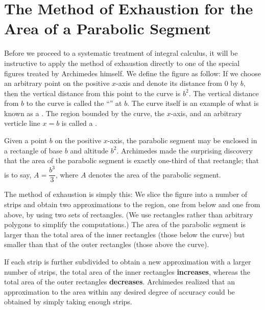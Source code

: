 \section{The Method of Exhaustion for the Area of a Parabolic Segment}\label{sec:1.1.3}

\begin{note}
  Before we proceed to a systematic treatment of integral calculus, it will be instructive to apply the method of exhaustion directly to one of the special figures treated by Archimedes himself.
  We define the figure as follow:
  If we choose an arbitrary point on the positive \(x\)-axis and denote its distance from \(0\) by \(b\), then the vertical distance from this point to the curve is \(b^2\).
  The vertical distance from \(b\) to the curve is called the ``'' at \(b\).
  The curve itself is an example of what is known as a \textbf{}.
  The region bounded by the curve, the \(x\)-axis, and an arbitrary verticle line \(x = b\) is called a \textbf{}.

  Given a point \(b\) on the positive \(x\)-axis, the parabolic segment may be enclosed in a rectangle of base \(b\) and altitude \(b^2\).
  Archimedes made the surprising discovery that the area of the parabolic segment is exactly one-third of that rectangle;
  that is to say, \(A = \dfrac{b^3}{3}\), where \(A\) denotes the area of the parabolic segment.

  The method of exhaustion is simply this:
  We slice the figure into a number of strips and obtain two approximations to the region, one from below and one from above, by using two sets of rectangles.
  (We use rectangles rather than arbitrary polygons to simplify the computations.)
  The area of the parabolic segment is larger than the total area of the inner rectangles (those below the curve) but smaller than that of the outer rectangles (those above the curve).

  If each strip is further subdivided to obtain a new approximation with a larger number of strips, the total area of the inner rectangles \textbf{increases}, whereas the total area of the outer rectangles \textbf{decreases}.
  Archimedes realized that an approximation to the area within any desired degree of accuracy could be obtained by simply taking enough strips.


\end{note}
